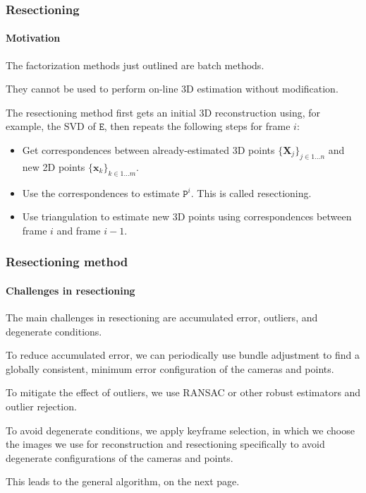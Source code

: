 \documentclass[aspectratio=169]{beamer}
\renewcommand{\vec}[1]{\boldsymbol{#1}}
\newcommand{\mat}[1]{\mathtt{#1}}
\begin{document}
\begin{frame}
\frametitle{Resectioning}
\framesubtitle{Motivation}

The factorization methods just outlined are \alert{batch} methods.

\medskip

They cannot be used to perform \alert{on-line} 3D estimation without
modification.

\medskip

The \alert{resectioning method} first gets an initial 3D
reconstruction using, for example, the SVD of $\mat{E}$, then repeats
the following steps for frame $i$:
\begin{itemize}
\item Get correspondences between already-estimated 3D points
  $\{\vec{X}_j\}_{j \in 1\ldots n}$ and new 2D points $\{\vec{x}_k\}_{k \in
    1\ldots m}$.
\item Use the correspondences to estimate $\mat{P}^i$.  This is called
  \alert{resectioning}.
\item Use triangulation to estimate new 3D points using
  correspondences between frame $i$ and frame $i-1$.
\end{itemize}

\end{frame}


\begin{frame}
\frametitle{Resectioning method}
\framesubtitle{Challenges in resectioning}

The main challenges in resectioning are \alert{accumulated error},
\alert{outliers}, and \alert{degenerate conditions}.

\medskip

To reduce accumulated error, we can periodically use bundle adjustment
to find a globally consistent, minimum error configuration of the
cameras and points.

\medskip

To mitigate the effect of outliers, we use RANSAC or other robust
estimators and outlier rejection.

\medskip

To avoid degenerate conditions, we apply \alert{keyframe selection},
in which we choose the images we use for reconstruction and
resectioning specifically to avoid degenerate configurations of the
cameras and points.

\medskip

This leads to the general algorithm, on the next page.

\end{frame}
\end{document}
